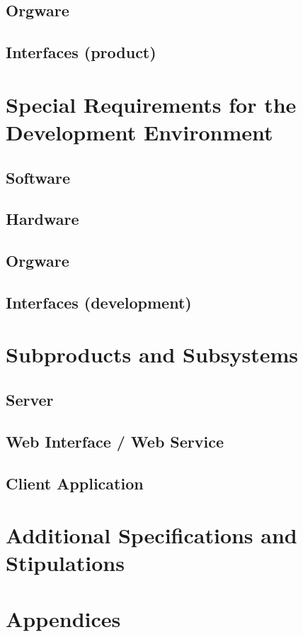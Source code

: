 \documentclass[11pt,a4paper,oneside,svgnames]{report}
\begin{document}
\section{Orgware}
\section{Interfaces (product)}

\chapter{Special Requirements for the Development Environment}
\section{Software}
\section{Hardware}
\section{Orgware}
\section{Interfaces (development)}

\chapter{Subproducts and Subsystems}
\section{Server}
\section{Web Interface / Web Service}
\section{Client Application}

\chapter{Additional Specifications and Stipulations}
\chapter{Appendices}
\printglossaries
\end{document}
